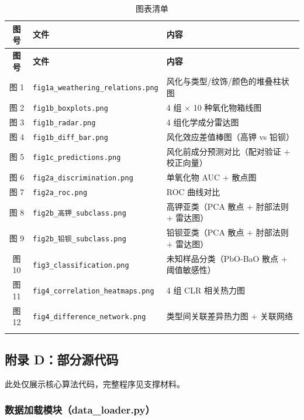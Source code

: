 \begin{longtable}{c p{6cm} p{6cm}}
    \toprule
    \textbf{图号} & \textbf{文件} & \textbf{内容} \\
    \midrule
    \endfirsthead
    \toprule
    \textbf{图号} & \textbf{文件} & \textbf{内容} \\
    \midrule
    \endhead
    图 1 & \texttt{fig1a\_weathering\_relations.png} & 风化与类型/纹饰/颜色的堆叠柱状图 \\
    图 2 & \texttt{fig1b\_boxplots.png} & 4 组 $\times$ 10 种氧化物箱线图 \\
    图 3 & \texttt{fig1b\_radar.png} & 4 组化学成分雷达图 \\
    图 4 & \texttt{fig1b\_diff\_bar.png} & 风化效应差值棒图（高钾 vs 铅钡） \\
    图 5 & \texttt{fig1c\_predictions.png} & 风化前成分预测对比（配对验证 $+$ 校正向量） \\
    图 6 & \texttt{fig2a\_discrimination.png} & 单氧化物 AUC $+$ 散点图 \\
    图 7 & \texttt{fig2a\_roc.png} & ROC 曲线对比 \\
    图 8 & \texttt{fig2b\_高钾\_subclass.png} & 高钾亚类（PCA 散点 $+$ 肘部法则 $+$ 雷达图） \\
    图 9 & \texttt{fig2b\_铅钡\_subclass.png} & 铅钡亚类（PCA 散点 $+$ 肘部法则 $+$ 雷达图） \\
    图 10 & \texttt{fig3\_classification.png} & 未知样品分类（PbO-BaO 散点 $+$ 阈值敏感性） \\
    图 11 & \texttt{fig4\_correlation\_heatmaps.png} & 4 组 CLR 相关热力图 \\
    图 12 & \texttt{fig4\_difference\_network.png} & 类型间关联差异热力图 $+$ 关联网络 \\
    \bottomrule
    \caption{图表清单}
    \label{tab:figures_list}
\end{longtable}

\subsection*{附录 D：部分源代码}

此处仅展示核心算法代码，完整程序见支撑材料。

\subsubsection*{数据加载模块（data\_loader.py）}

